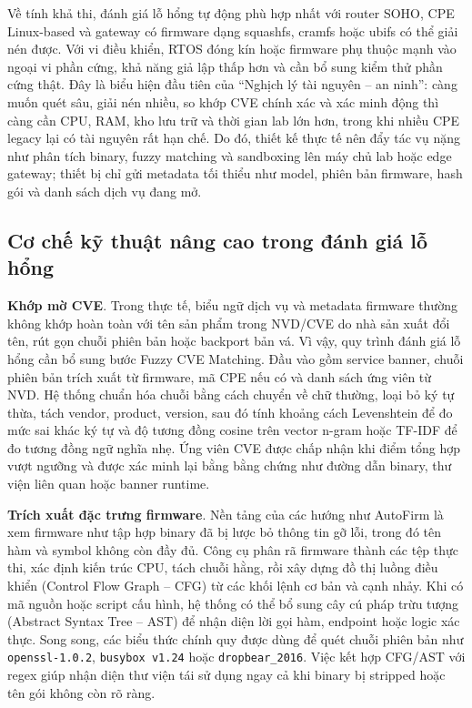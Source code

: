 \documentclass[../DoAn.tex]{subfiles}
\begin{document}
Về tính khả thi, đánh giá lỗ hổng tự động phù hợp nhất với router SOHO, CPE Linux-based và gateway có firmware dạng squashfs, cramfs hoặc ubifs có thể giải nén được. Với vi điều khiển, RTOS đóng kín hoặc firmware phụ thuộc mạnh vào ngoại vi phần cứng, khả năng giả lập thấp hơn và cần bổ sung kiểm thử phần cứng thật. Đây là biểu hiện đầu tiên của ``Nghịch lý tài nguyên -- an ninh'': càng muốn quét sâu, giải nén nhiều, so khớp CVE chính xác và xác minh động thì càng cần CPU, RAM, kho lưu trữ và thời gian lab lớn hơn, trong khi nhiều CPE legacy lại có tài nguyên rất hạn chế. Do đó, thiết kế thực tế nên đẩy tác vụ nặng như phân tích binary, fuzzy matching và sandboxing lên máy chủ lab hoặc edge gateway; thiết bị chỉ gửi metadata tối thiểu như model, phiên bản firmware, hash gói và danh sách dịch vụ đang mở.

\subsection{Cơ chế kỹ thuật nâng cao trong đánh giá lỗ hổng}
\textbf{Khớp mờ CVE}. Trong thực tế, biểu ngữ dịch vụ và metadata firmware thường không khớp hoàn toàn với tên sản phẩm trong NVD/CVE do nhà sản xuất đổi tên, rút gọn chuỗi phiên bản hoặc backport bản vá. Vì vậy, quy trình đánh giá lỗ hổng cần bổ sung bước Fuzzy CVE Matching. Đầu vào gồm service banner, chuỗi phiên bản trích xuất từ firmware, mã CPE nếu có và danh sách ứng viên từ NVD. Hệ thống chuẩn hóa chuỗi bằng cách chuyển về chữ thường, loại bỏ ký tự thừa, tách vendor, product, version, sau đó tính khoảng cách Levenshtein để đo mức sai khác ký tự và độ tương đồng cosine trên vector n-gram hoặc TF-IDF để đo tương đồng ngữ nghĩa nhẹ. Ứng viên CVE được chấp nhận khi điểm tổng hợp vượt ngưỡng và được xác minh lại bằng bằng chứng như đường dẫn binary, thư viện liên quan hoặc banner runtime.

\textbf{Trích xuất đặc trưng firmware}. Nền tảng của các hướng như AutoFirm là xem firmware như tập hợp binary đã bị lược bỏ thông tin gỡ lỗi, trong đó tên hàm và symbol không còn đầy đủ. Công cụ phân rã firmware thành các tệp thực thi, xác định kiến trúc CPU, tách chuỗi hằng, rồi xây dựng đồ thị luồng điều khiển (Control Flow Graph -- CFG) từ các khối lệnh cơ bản và cạnh nhảy. Khi có mã nguồn hoặc script cấu hình, hệ thống có thể bổ sung cây cú pháp trừu tượng (Abstract Syntax Tree -- AST) để nhận diện lời gọi hàm, endpoint hoặc logic xác thực. Song song, các biểu thức chính quy được dùng để quét chuỗi phiên bản như \texttt{openssl-1.0.2}, \texttt{busybox v1.24} hoặc \texttt{dropbear\_2016}. Việc kết hợp CFG/AST với regex giúp nhận diện thư viện tái sử dụng ngay cả khi binary bị stripped hoặc tên gói không còn rõ ràng.
\end{document}

